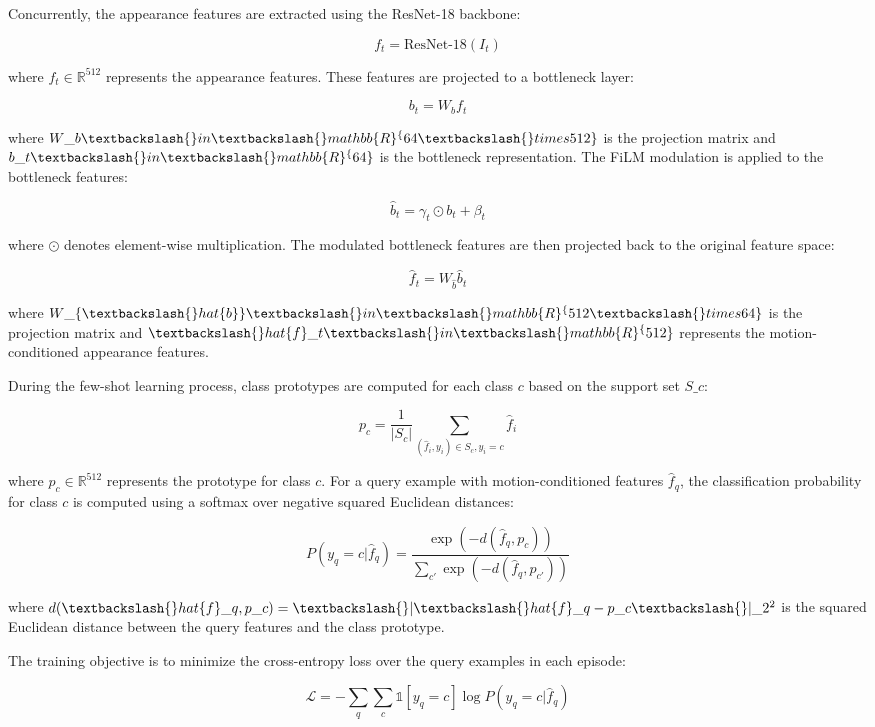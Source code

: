 \documentclass[11pt]{article}
\begin{document}
Concurrently, the appearance features are extracted using the ResNet-18 backbone:

$$f_t = \text{ResNet-18}(I_t)$$

where $f_t \in \mathbb{R}^{512}$ represents the appearance features. These features are projected to a bottleneck layer:

$$b_t = W_b f_t$$

where $W\_b \textbackslash\{\}in \textbackslash\{\}mathbb\{R\}^\{64 \textbackslash\{\}times 512\}$ is the projection matrix and $b\_t \textbackslash\{\}in \textbackslash\{\}mathbb\{R\}^\{64\}$ is the bottleneck representation. The FiLM modulation is applied to the bottleneck features:

$$\hat{b}_t = \gamma_t \odot b_t + \beta_t$$

where $\odot$ denotes element-wise multiplication. The modulated bottleneck features are then projected back to the original feature space:

$$\hat{f}_t = W_{\hat{b}} \hat{b}_t$$

where $W\_\{\textbackslash\{\}hat\{b\}\} \textbackslash\{\}in \textbackslash\{\}mathbb\{R\}^\{512 \textbackslash\{\}times 64\}$ is the projection matrix and $\textbackslash\{\}hat\{f\}\_t \textbackslash\{\}in \textbackslash\{\}mathbb\{R\}^\{512\}$ represents the motion-conditioned appearance features.

During the few-shot learning process, class prototypes are computed for each class $c$ based on the support set $S\_c$:

$$p_c = \frac{1}{|S_c|} \sum_{(\hat{f}_i, y_i) \in S_c, y_i = c} \hat{f}_i$$

where $p_c \in \mathbb{R}^{512}$ represents the prototype for class $c$. For a query example with motion-conditioned features $\hat{f}_q$, the classification probability for class $c$ is computed using a softmax over negative squared Euclidean distances:

$$P(y_q = c | \hat{f}_q) = \frac{\exp(-d(\hat{f}_q, p_c))}{\sum_{c'} \exp(-d(\hat{f}_q, p_{c'}))}$$

where $d(\textbackslash\{\}hat\{f\}\_q, p\_c) = \textbackslash\{\}|\textbackslash\{\}hat\{f\}\_q - p\_c\textbackslash\{\}|\_2^2$ is the squared Euclidean distance between the query features and the class prototype.

The training objective is to minimize the cross-entropy loss over the query examples in each episode:

$$\mathcal{L} = -\sum_{q} \sum_{c} \mathbb{1}[y_q = c] \log P(y_q = c | \hat{f}_q)$$
\end{document}
